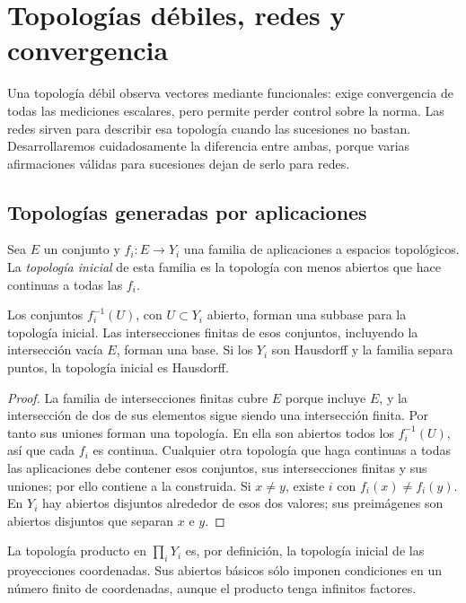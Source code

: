 \chapter{Topologías débiles, redes y convergencia}\label{cap:v3-08}
Una topología débil observa vectores mediante funcionales: exige convergencia de todas las mediciones escalares, pero permite perder control sobre la norma. Las redes sirven para describir esa topología cuando las sucesiones no bastan. Desarrollaremos cuidadosamente la diferencia entre ambas, porque varias afirmaciones válidas para sucesiones dejan de serlo para redes.

\section{Topologías generadas por aplicaciones}\label{lec:v3-13}
\begin{definicion}
Sea $E$ un conjunto y $f_i:E\to Y_i$ una familia de aplicaciones a espacios topológicos. La \emph{topología inicial} de esta familia es la topología con menos abiertos que hace continuas a todas las $f_i$.
\end{definicion}
\begin{proposicion}\label{v3:topologia-inicial}
Los conjuntos $f_i^{-1}(U)$, con $U\subset Y_i$ abierto, forman una subbase para la topología inicial. Las intersecciones finitas de esos conjuntos, incluyendo la intersección vacía $E$, forman una base. Si los $Y_i$ son Hausdorff y la familia separa puntos, la topología inicial es Hausdorff.
\end{proposicion}
\begin{proof}
La familia de intersecciones finitas cubre $E$ porque incluye $E$, y la intersección de dos de sus elementos sigue siendo una intersección finita. Por tanto sus uniones forman una topología. En ella son abiertos todos los $f_i^{-1}(U)$, así que cada $f_i$ es continua. Cualquier otra topología que haga continuas a todas las aplicaciones debe contener esos conjuntos, sus intersecciones finitas y sus uniones; por ello contiene a la construida. Si $x\ne y$, existe $i$ con $f_i(x)\ne f_i(y)$. En $Y_i$ hay abiertos disjuntos alrededor de esos dos valores; sus preimágenes son abiertos disjuntos que separan $x$ e $y$.
\end{proof}
La topología producto en $\prod_iY_i$ es, por definición, la topología inicial de las proyecciones coordenadas. Sus abiertos básicos sólo imponen condiciones en un número finito de coordenadas, aunque el producto tenga infinitos factores.

